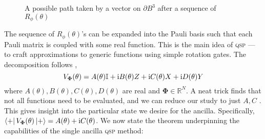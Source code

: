 \documentclass{article}
\begin{document}
\begin{figure}[h!]
    \centering
    \def\r{1.5}
    \caption{A possible path taken by a vector on $\partial B^3$ after a sequence of $R_\phi(\theta)$}
    \label{fig:phi_graph2}
\end{figure}


The sequence of $R_\phi(\theta)$'s can be expanded into the Pauli basis such that each Pauli matrix is coupled with some real function. This is the main idea of \textsc{qsp} --- to craft approximations to generic functions using simple rotation gates. The decomposition follows \cite{LYC16,LC19},
\begin{equation}
    V_{\boldsymbol{\Phi}}(\theta) = A(\theta)\mathbb{I} + \mathrm{i} B(\theta)Z + \mathrm{i} C(\theta)X + \mathrm{i} D(\theta)Y
\end{equation}
where $A(\theta),B(\theta),C(\theta),D(\theta)$ are real and $\boldsymbol{\Phi}\in\mathbb{R}^N$. A neat trick finds that not all functions need to be evaluated, and we can reduce our study to just $A,C$ \cite{LC19}. This gives insight into the particular state we desire for the ancilla. Specifically, $\bra{+}V_{\boldsymbol{\Phi}}(\theta)\ket{+} = A(\theta) + \mathrm{i} C(\theta)$. We now state the theorem underpinning the capabilities of the single ancilla \textsc{qsp} method:
\end{document}
